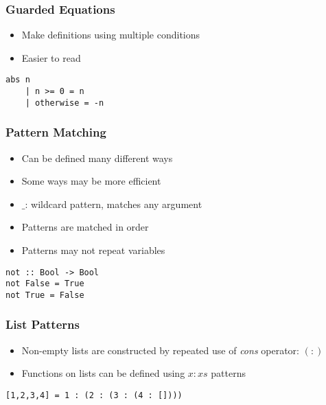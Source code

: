 \subsubsection{Guarded Equations}
\begin{itemize}
    \item Make definitions using multiple conditions
    \item Easier to read
\end{itemize}
\begin{lstlisting}
abs n
    | n >= 0 = n
    | otherwise = -n
\end{lstlisting}

\subsubsection{Pattern Matching}
\begin{itemize}
    \item Can be defined many different ways
    \item Some ways may be more efficient
    \item $\_$: wildcard pattern, matches any argument
    \item Patterns are matched in order
    \item Patterns may not repeat variables
\end{itemize}
\begin{lstlisting}
not :: Bool -> Bool
not False = True
not True = False
\end{lstlisting}

\subsubsection{List Patterns}
\begin{itemize}
    \item Non-empty lists are constructed by repeated use of \textit{cons} operator: $(:)$
    \item Functions on lists can be defined using $x : xs$ patterns
\end{itemize}
\begin{lstlisting}
[1,2,3,4] = 1 : (2 : (3 : (4 : [])))
\end{lstlisting}


